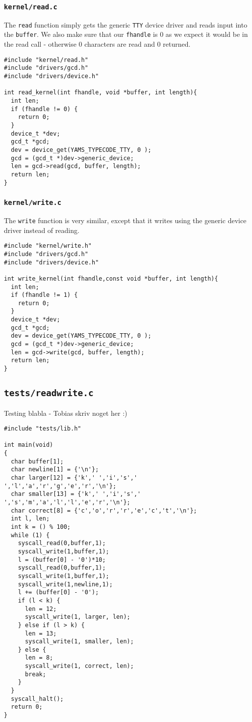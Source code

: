 \documentclass[a4paper,12pt]{article}
\begin{document}
\subsubsection{\texttt{kernel/read.c}}
The \texttt{read} function simply gets the generic \texttt{TTY} device driver and reads input into the \texttt{buffer}. We also make sure that our \texttt{fhandle} is 0 as we expect it would be in the read call - otherwise 0 characters are read and 0 returned.

\begin{lstlisting}
#include "kernel/read.h"
#include "drivers/gcd.h"
#include "drivers/device.h"

int read_kernel(int fhandle, void *buffer, int length){
  int len;
  if (fhandle != 0) {
    return 0;
  }
  device_t *dev;
  gcd_t *gcd;
  dev = device_get(YAMS_TYPECODE_TTY, 0 );
  gcd = (gcd_t *)dev->generic_device;
  len = gcd->read(gcd, buffer, length);
  return len;
}
\end{lstlisting}

\subsubsection{\texttt{kernel/write.c} }
The \texttt{write} function is very similar, except that it writes using the generic device driver instead of reading.

\begin{lstlisting}
#include "kernel/write.h"
#include "drivers/gcd.h"
#include "drivers/device.h"

int write_kernel(int fhandle,const void *buffer, int length){
  int len;
  if (fhandle != 1) {
    return 0;
  }
  device_t *dev;
  gcd_t *gcd;
  dev = device_get(YAMS_TYPECODE_TTY, 0 );
  gcd = (gcd_t *)dev->generic_device;
  len = gcd->write(gcd, buffer, length);
  return len;
}
\end{lstlisting}

\subsection{\texttt{tests/readwrite.c}}
Testing blabla - Tobias skriv noget her :)
\begin{lstlisting}
#include "tests/lib.h"

int main(void)
{
  char buffer[1];
  char newline[1] = {'\n'};
  char larger[12] = {'k',' ','i','s',' ','l','a','r','g','e','r','\n'};
  char smaller[13] = {'k',' ','i','s',' ','s','m','a','l','l','e','r','\n'};
  char correct[8] = {'c','o','r','r','e','c','t','\n'};
  int l, len;
  int k = () % 100;
  while (1) {
    syscall_read(0,buffer,1);
    syscall_write(1,buffer,1);
    l = (buffer[0] - '0')*10;
    syscall_read(0,buffer,1);
    syscall_write(1,buffer,1);
    syscall_write(1,newline,1);
    l += (buffer[0] - '0');
    if (l < k) {
      len = 12;
      syscall_write(1, larger, len);
    } else if (l > k) { 
      len = 13;
      syscall_write(1, smaller, len);
    } else {
      len = 8;
      syscall_write(1, correct, len);
      break;
    }
  }
  syscall_halt();
  return 0;
}
\end{lstlisting}
\end{document}
